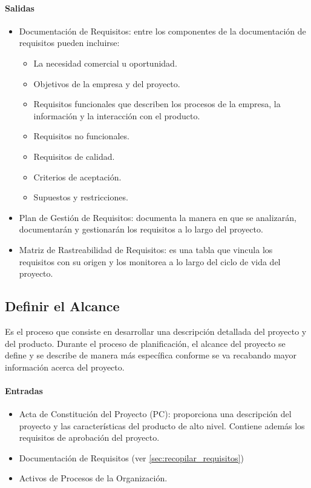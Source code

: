 \documentclass[a4paper,twosides]{article}
\newlength{\wideitemsep}
\let\olditem\item
\renewcommand{\item}{\setlength{\itemsep}{\wideitemsep}\olditem}
\begin{document}
\paragraph{Salidas}
\begin{itemize}
\item Documentación de Requisitos: entre los componentes de la documentación de requisitos pueden incluirse:
\begin{itemize}
\item La necesidad comercial u oportunidad.
\item Objetivos de la empresa y del proyecto.
\item Requisitos funcionales que describen los procesos de la empresa, la información y la interacción con el producto.
\item Requisitos no funcionales.
\item Requisitos de calidad.
\item Criterios de aceptación.
\item Supuestos y restricciones.
\end{itemize}
\item Plan de Gestión de Requisitos: documenta la manera en que se analizarán, documentarán y gestionarán los requisitos a lo largo del proyecto.
\item Matriz de Rastreabilidad de Requisitos: es una tabla que vincula los requisitos con su origen y los monitorea a lo largo del ciclo de vida del proyecto.
\end{itemize}
\subsection{Definir el Alcance} \label{sec:definir_alcance}
\par Es el proceso que consiste en desarrollar una descripción detallada del proyecto y del producto. Durante el proceso de planificación, el alcance del proyecto se define y se describe de manera más específica conforme se va recabando mayor información acerca del proyecto.
\paragraph{Entradas}
\begin{itemize}
\item Acta de Constitución del Proyecto (PC): proporciona una descripción del proyecto y las características del producto de alto nivel. Contiene además los requisitos de aprobación del proyecto.
\item Documentación de Requisitos (ver \ref{sec:recopilar_requisitos})
\item Activos de Procesos de la Organización.
\end{itemize}
\end{document}
